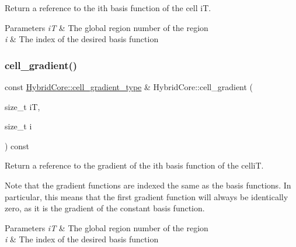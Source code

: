 Return a reference to the i\textquotesingle{}th basis function of the cell iT. 


\begin{DoxyParams}{Parameters}
{\em iT} & The global region number of the region \\
\hline
{\em i} & The index of the desired basis function \\
\hline
\end{DoxyParams}
\mbox{\label{classHArDCore2D_1_1HybridCore_a710fc23b914623b90a2699ab4291e539}} 
\subsubsection{\texorpdfstring{cell\+\_\+gradient()}{cell\_gradient()}}
{\footnotesize\ttfamily const \hyperlink{classHArDCore2D_1_1HybridCore_a41350d7c3ac5a5a5e932348d2c9d0750}{Hybrid\+Core\+::cell\+\_\+gradient\+\_\+type} \& Hybrid\+Core\+::cell\+\_\+gradient (\begin{DoxyParamCaption}\item[{size\+\_\+t}]{iT,  }\item[{size\+\_\+t}]{i }\end{DoxyParamCaption}) const}



Return a reference to the gradient of the i\textquotesingle{}th basis function of the celliT. 

Note that the gradient functions are indexed the same as the basis functions. In particular, this means that the first gradient function will always be identically zero, as it is the gradient of the constant basis function. 
\begin{DoxyParams}{Parameters}
{\em iT} & The global region number of the region \\
\hline
{\em i} & The index of the desired basis function \\
\hline
\end{DoxyParams}
\mbox{\label{classHArDCore2D_1_1HybridCore_a9ecd6ca61d4f9e3f3e3af81d8de394d0}} 

